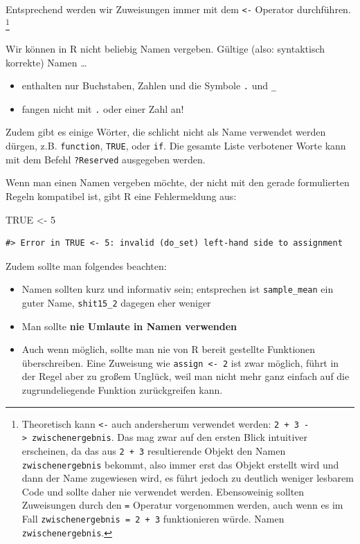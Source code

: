 \documentclass[]{book}
\newenvironment{Shaded}{\begin{snugshade}}{\end{snugshade}}
\newcommand{\DecValTok}[1]{\textcolor[rgb]{0.00,0.00,0.81}{#1}}
\newcommand{\StringTok}[1]{\textcolor[rgb]{0.31,0.60,0.02}{#1}}
\newcommand{\OtherTok}[1]{\textcolor[rgb]{0.56,0.35,0.01}{#1}}
\newcommand{\NormalTok}[1]{#1}
\providecommand{\tightlist}{%
  \setlength{\itemsep}{0pt}\setlength{\parskip}{0pt}}
\let\rmarkdownfootnote\footnote%
\def\footnote{\protect\rmarkdownfootnote}
\begin{document}
Entsprechend werden wir Zuweisungen immer mit dem \texttt{\textless{}-}
Operator durchführen. \footnote{Theoretisch kann \texttt{\textless{}-}
  auch andersherum verwendet werden:
  \texttt{2\ +\ 3\ -\textgreater{}\ zwischenergebnis}. Das mag zwar auf
  den ersten Blick intuitiver erscheinen, da das aus \texttt{2\ +\ 3}
  resultierende Objekt den Namen \texttt{zwischenergebnis} bekommt, also
  immer erst das Objekt erstellt wird und dann der Name zugewiesen wird,
  es führt jedoch zu deutlich weniger lesbarem Code und sollte daher nie
  verwendet werden. Ebensoweinig sollten Zuweisungen durch den
  \texttt{=} Operatur vorgenommen werden, auch wenn es im Fall
  \texttt{zwischenergebnis\ =\ 2\ +\ 3} funktionieren würde. Namen
  \texttt{zwischenergebnis}.}

Wir können in R nicht beliebig Namen vergeben. Gültige (also:
syntaktisch korrekte) Namen \ldots{}

\begin{itemize}
\tightlist
\item
  enthalten nur Buchstaben, Zahlen und die Symbole \texttt{.} und
  \texttt{\_}
\item
  fangen nicht mit \texttt{.} oder einer Zahl an!
\end{itemize}

Zudem gibt es einige Wörter, die schlicht nicht als Name verwendet
werden dürgen, z.B. \texttt{function}, \texttt{TRUE}, oder \texttt{if}.
Die gesamte Liste verbotener Worte kann mit dem Befehl
\texttt{?Reserved} ausgegeben werden.

Wenn man einen Namen vergeben möchte, der nicht mit den gerade
formulierten Regeln kompatibel ist, gibt R eine Fehlermeldung aus:

\begin{Shaded}
\begin{Highlighting}[]
\OtherTok{TRUE}\NormalTok{ <-}\StringTok{ }\DecValTok{5}
\end{Highlighting}
\end{Shaded}

\begin{verbatim}
#> Error in TRUE <- 5: invalid (do_set) left-hand side to assignment
\end{verbatim}

Zudem sollte man folgendes beachten:

\begin{itemize}
\tightlist
\item
  Namen sollten kurz und informativ sein; entsprechen ist
  \texttt{sample\_mean} ein guter Name, \texttt{shit15\_2} dagegen eher
  weniger
\item
  Man sollte \textbf{nie Umlaute in Namen verwenden}
\item
  Auch wenn möglich, sollte man nie von R bereit gestellte Funktionen
  überschreiben. Eine Zuweisung wie \texttt{assign\ \textless{}-\ 2} ist
  zwar möglich, führt in der Regel aber zu großem Unglück, weil man
  nicht mehr ganz einfach auf die zugrundeliegende Funktion
  zurückgreifen kann.
\end{itemize}
\end{document}
